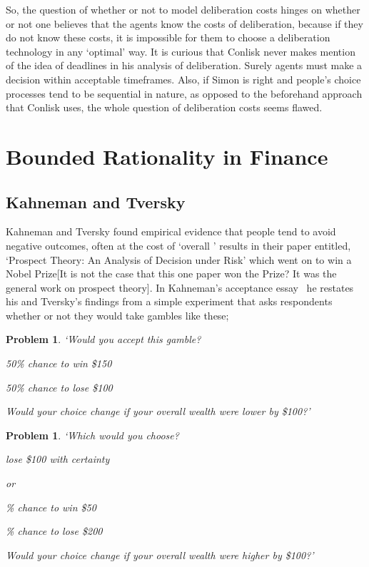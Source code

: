 \documentclass{ucthesis}
\newtheorem{problem}[theorem]{Problem}
\begin{document}
So, the question of whether or not to model deliberation costs hinges on
whether or not one believes that the agents know the costs of deliberation,
because if they do not know these costs, it is impossible for them to choose
a deliberation technology in any `optimal' way. It is curious that Conlisk
never makes mention of the idea of deadlines in his analysis of
deliberation. Surely agents must make a decision within acceptable
timeframes. Also, if Simon is right and people's choice processes tend to be
sequential in nature, as opposed to the beforehand approach that Conlisk
uses, the whole question of deliberation costs seems flawed.

\section{Bounded Rationality in Finance}

\subsection{Kahneman and Tversky}

Kahneman and Tversky \cite[1979]{prospect} found empirical evidence that
people tend to avoid negative outcomes, often at the cost of `overall '
results in their paper entitled, `Prospect Theory: An Analysis of Decision
under Risk' which went on to win a Nobel Prize{\LARGE [It is not the case
that this one paper won the Prize? It was the general work on prospect
theory]}. In Kahneman's acceptance essay \cite[2003]{Kahneman 2003} \ he
restates his and Tversky's findings from a simple experiment that asks
respondents whether or not they would take gambles like these;

\begin{problem}
`Would you accept this gamble?

\textit{50\% chance to win \$150}

50\% chance to lose \$100

Would your choice change if your overall wealth were lower by \$100?' \cite[%
pp. 1455]{Kahneman 2003}
\end{problem}

\begin{problem}
`Which would you choose?

\qquad lose \$100 with certainty

or

\% chance to win \$50

\% chance to lose \$200

Would your choice change if your overall wealth were higher by \$100?' \cite[%
pp1456]{Kahneman 2003}
\end{problem}
\end{document}
